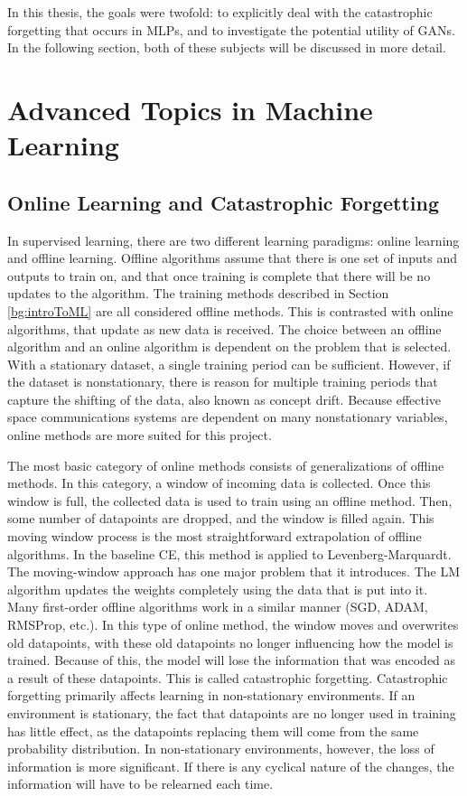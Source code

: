 	\par In this thesis, the goals were twofold: to explicitly deal with the catastrophic forgetting that occurs in MLPs, and to investigate the potential utility of GANs. In the following section, both of these subjects will be discussed in more detail.
	
	\section{Advanced Topics in Machine Learning}
	\subsection{Online Learning and Catastrophic Forgetting}
	\par In supervised learning, there are two different learning paradigms: online learning and offline learning. Offline algorithms assume that there is one set of inputs and outputs to train on, and that once training is complete that there will be no updates to the algorithm. The training methods described in Section \ref{bg:introToML} are all considered offline methods. This is contrasted with online algorithms, that update as new data is received. The choice between an offline algorithm and an online algorithm is dependent on the problem that is selected. With a stationary dataset, a single training period can be sufficient. However, if the dataset is nonstationary, there is reason for multiple training periods that capture the shifting of the data, also known as concept drift. Because effective space communications systems are dependent on many nonstationary variables, online methods are more suited for this project.
	\par The most basic category of online methods consists of generalizations of offline methods. In this category, a window of incoming data is collected. Once this window is full, the collected data is used to train using an offline method. Then, some number of datapoints are dropped, and the window is filled again. This moving window process is the most straightforward extrapolation of offline algorithms. In the baseline CE, this method is applied to Levenberg-Marquardt. The moving-window approach has one major problem that it introduces. The LM algorithm updates the weights completely using the data that is put into it. Many first-order offline algorithms work in a similar manner (SGD, ADAM, RMSProp, etc.). In this type of online method, the window moves and overwrites old datapoints, with these old datapoints no longer influencing how the model is trained. Because of this, the model will lose the information that was encoded as a result of these datapoints. This is called catastrophic forgetting.  Catastrophic forgetting primarily affects learning in non-stationary environments. If an environment is stationary, the fact that datapoints are no longer used in training has little effect, as the datapoints replacing them will come from the same probability distribution. In non-stationary environments, however, the loss of information is more significant. If there is any cyclical nature of the changes, the information will have to be relearned each time.
